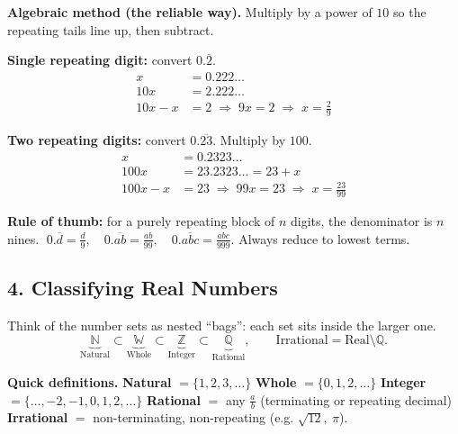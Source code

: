 \documentclass[11pt]{article}
\newcommand{\rep}[1]{\overline{#1}}
\begin{document}
\textbf{Algebraic method (the reliable way).}
Multiply by a power of $10$ so the repeating tails line up, then subtract.

\begin{examplebox}
\textbf{Single repeating digit:} convert $0.\rep{2}$.
\begin{align*}
x &= 0.222\ldots\\
10x &= 2.222\ldots\\
10x - x &= 2 \;\Longrightarrow\; 9x = 2 \;\Longrightarrow\; \boxed{x=\tfrac{2}{9}}
\end{align*}
\end{examplebox}

\begin{examplebox}
\textbf{Two repeating digits:} convert $0.\rep{23}$. Multiply by $100$.
\begin{align*}
x &= 0.2323\ldots\\
100x &= 23.2323\ldots = 23 + x\\
100x - x &= 23 \;\Longrightarrow\; 99x = 23 \;\Longrightarrow\; \boxed{x=\tfrac{23}{99}}
\end{align*}
\end{examplebox}

\textbf{Rule of thumb:} for a purely repeating block of $n$ digits, the denominator
is $n$ nines. $\;0.\rep{d}=\tfrac{d}{9},\quad 0.\rep{ab}=\tfrac{ab}{99},\quad
0.\rep{abc}=\tfrac{abc}{999}.$ Always reduce to lowest terms.

\subsection*{4.\; Classifying Real Numbers}

Think of the number sets as nested ``bags'': each set sits inside the larger one.
\[
\underbrace{\mathbb{N}}_{\text{Natural}}\subset
\underbrace{\mathbb{W}}_{\text{Whole}}\subset
\underbrace{\mathbb{Z}}_{\text{Integer}}\subset
\underbrace{\mathbb{Q}}_{\text{Rational}},
\qquad
\text{Irrational} = \text{Real} \setminus \mathbb{Q}.
\]

\begin{conceptbox}
\textbf{\color{fangblue}Quick definitions.}
\textbf{Natural} $=\{1,2,3,\dots\}$ \; \textbullet\;
\textbf{Whole} $=\{0,1,2,\dots\}$ \; \textbullet\;
\textbf{Integer} $=\{\dots,-2,-1,0,1,2,\dots\}$ \; \textbullet\;
\textbf{Rational} $=$ any $\tfrac{a}{b}$ (terminating or repeating decimal) \; \textbullet\;
\textbf{Irrational} $=$ non-terminating, non-repeating (e.g. $\sqrt{12},\ \pi$).
\end{conceptbox}
\end{document}
